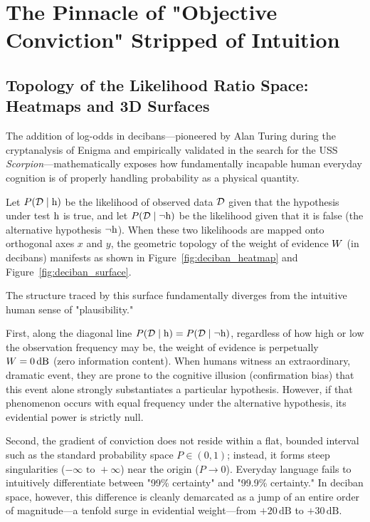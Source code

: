     \section{The Pinnacle of "Objective Conviction" Stripped of Intuition}
    \label{sec:objective_conviction}

    \subsection{Topology of the Likelihood Ratio Space: Heatmaps and 3D Surfaces}

    The addition of log-odds in decibans—pioneered by Alan Turing during the cryptanalysis of Enigma and empirically validated in the search for the USS \textit{Scorpion}—mathematically exposes how fundamentally incapable human everyday cognition is of properly handling probability as a physical quantity.

    Let $P(\mathcal{D} \mid \mathrm{h})$ be the likelihood of observed data $\mathcal{D}$ given that the hypothesis under test $\mathrm{h}$ is true, and let $P(\mathcal{D} \mid \neg \mathrm{h})$ be the likelihood given that it is false (the alternative hypothesis $\neg \mathrm{h}$). When these two likelihoods are mapped onto orthogonal axes $x$ and $y$, the geometric topology of the weight of evidence $W$ (in decibans) manifests as shown in Figure~\ref{fig:deciban_heatmap} and Figure~\ref{fig:deciban_surface}.

    
    

    The structure traced by this surface fundamentally diverges from the intuitive human sense of "plausibility."

    First, along the diagonal line $P(\mathcal{D} \mid \mathrm{h}) = P(\mathcal{D} \mid \neg \mathrm{h})$, regardless of how high or low the observation frequency may be, the weight of evidence is perpetually $W = 0\,\text{dB}$ (zero information content). When humans witness an extraordinary, dramatic event, they are prone to the cognitive illusion (confirmation bias) that this event alone strongly substantiates a particular hypothesis. However, if that phenomenon occurs with equal frequency under the alternative hypothesis, its evidential power is strictly null.

    Second, the gradient of conviction does not reside within a flat, bounded interval such as the standard probability space $P \in (0, 1)$; instead, it forms steep singularities ($-\infty \text{ to } +\infty$) near the origin ($P \to 0$). Everyday language fails to intuitively differentiate between "99\% certainty" and "99.9\% certainty." In deciban space, however, this difference is cleanly demarcated as a jump of an entire order of magnitude—a tenfold surge in evidential weight—from $+20\,\text{dB}$ to $+30\,\text{dB}$.

